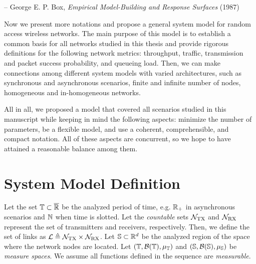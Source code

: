 {-- George E. P. Box, \textit{Empirical Model-Building and Response Surfaces} (1987)}

Now we present more notations and propose a general system model for random access wireless networks.
%
The main purpose of this model is to establish a common basis for all networks studied in this thesis and provide rigorous definitions for the following network metrics: throughput, traffic, transmission and packet success probability, and queueing load.
%
Then, we can make connections among different system models with varied architectures, such as synchronous and asynchronous scenarios, finite and infinite number of nodes, homogeneous and in-homogeneous networks.

All in all, we proposed a model that covered all scenarios studied in this manuscript while keeping in mind the following aspects: minimize the number of parameters, be a flexible model, and use a coherent, comprehensible, and compact notation.
%
All of these aspects are concurrent, so we hope to have attained a reasonable balance among them.

\newpage

\section{System Model Definition} \label{sec:SysModDef}

%
Let the set $\T\subset\overline\R$ be the analyzed period of time, e.g. $\R_+$ in asynchronous scenarios and $\N$ when time is slotted.
%
Let the \textit{countable} sets $\cal{N}_\TX$ and $\cal{N}_\RX$ represent the set of transmitters and receivers, respectively. Then, we define the set of links as $\cal{L} \triangleq \cal{N}_\TX \times \cal{N}_\RX$.
%
Let $\S\subset \R^d$ be the analyzed region of the space where the network nodes are located.
%
Let $(\T,\cal{B}(\T),\mu_\T)$ and $(\S,\cal{B}(\S),\mu_\S)$ be \textit{measure spaces}. We assume all functions defined in the sequence are \textit{measurable}. %

